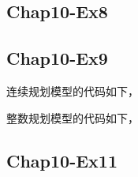 \documentclass[12pt,a4paper]{article}
\begin{document}
\subsection{Chap10-Ex8}\label{sec:ex8_code}



\subsection{Chap10-Ex9}\label{sec:ex9_code}

连续规划模型的代码如下，


整数规划模型的代码如下，


\subsection{Chap10-Ex11}\label{sec:ex11_code}


\end{document}
